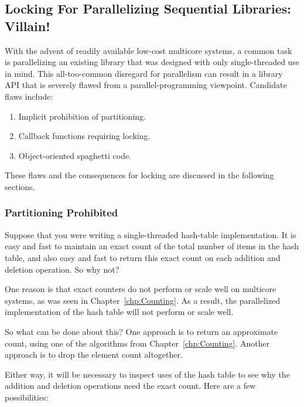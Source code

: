 \subsection{Locking For Parallelizing Sequential Libraries: Villain!}
\label{sec:locking:Locking For Parallelizing Sequential Libraries: Villain!}

With the advent of readily available low-cost multicore systems,
a common task is parallelizing an existing library that was designed
with only single-threaded use in mind.
This all-too-common disregard for parallelism can result in a library
API that is severely flawed from a parallel-programming viewpoint.
Candidate flaws include:

\begin{enumerate}
\item	Implicit prohibition of partitioning.
\item	Callback functions requiring locking.
\item	Object-oriented spaghetti code.
\end{enumerate}

These flaws and the consequences for locking are discussed in the following
sections.

\subsubsection{Partitioning Prohibited}
\label{sec:locking:Partitioning Prohibited}

Suppose that you were writing a single-threaded hash-table implementation.
It is easy and fast to maintain an exact count of the total number of items
in the hash table, and also easy and fast to return this exact count on each
addition and deletion operation.
So why not?

One reason is that exact counters do not perform or scale well on
multicore systems, as was
seen in Chapter~\ref{chp:Counting}.
As a result, the parallelized implementation of the hash table will not
perform or scale well.

So what can be done about this?
One approach is to return an approximate count, using one of the algorithms
from Chapter~\ref{chp:Counting}.
Another approach is to drop the element count altogether.

Either way, it will be necessary to inspect uses of the hash table to see
why the addition and deletion operations need the exact count.
Here are a few possibilities:

